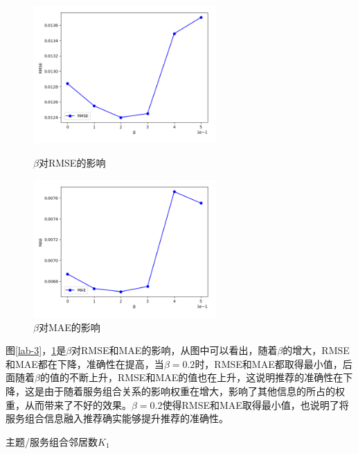 \documentclass[master,winfonts]{njuthesis}
\begin{document}
\begin{arabicenum}
\begin{figure}[htbp]
\centering
\begin{minipage}[t]{0.48\textwidth}
\centering
\includegraphics[width=7cm]{beta_a.png}
\caption{$\beta$对RMSE的影响}\label{lab-3}
\end{minipage}
\begin{minipage}[t]{0.48\textwidth}
\centering
\includegraphics[width=7cm]{beta_b.png}
\caption{$\beta$对MAE的影响}\label{lab-4}
\end{minipage}
\end{figure}

图\ref{lab-3}，\ref{lab-4}是$\beta$对RMSE和MAE的影响，从图中可以看出，随着$\beta$的增大，RMSE和MAE都在下降，准确性在提高，当$\beta=0.2$时，RMSE和MAE都取得最小值，后面随着$\beta$的值的不断上升，RMSE和MAE的值也在上升，这说明推荐的准确性在下降，这是由于随着服务组合关系的影响权重在增大，影响了其他信息的所占的权重，从而带来了不好的效果。$\beta=0.2$使得RMSE和MAE取得最小值，也说明了将服务组合信息融入推荐确实能够提升推荐的准确性。

\item 主题/服务组合邻居数$K_1$


\end{arabicenum}
\end{document}
